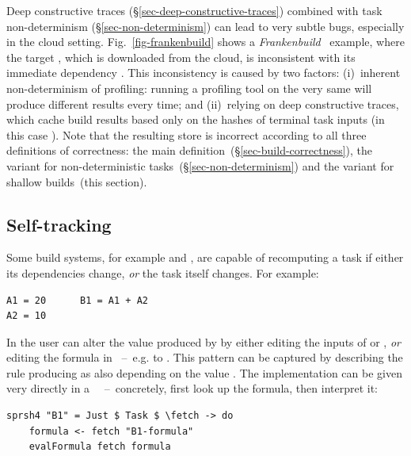 Deep constructive traces (\S\ref{sec-deep-constructive-traces}) combined with
task non-determinism (\S\ref{sec-non-determinism}) can lead to very subtle bugs,
especially in the cloud setting. Fig.~\ref{fig-frankenbuild} shows a
\emph{Frankenbuild}~\cite{esfahani2016cloudbuild} example, where the target
, which is downloaded from the cloud, is inconsistent with its
immediate dependency . This inconsistency is caused by two factors:
(i)~inherent non-determinism of profiling: running a profiling tool on the very
same  will produce different  results every time;
and (ii)~relying on deep constructive traces, which cache build results based
only on the hashes of terminal task inputs (in this case ). Note
that the resulting store is incorrect according to all three definitions of
correctness: the main definition~(\S\ref{sec-build-correctness}), the variant
for non-deterministic tasks~(\S\ref{sec-non-determinism}) and the variant for
shallow builds~(this section).


\subsection{Self-tracking}\label{sec-tracking-aspects}

Some build systems, for example \Excel and \Ninja, are capable of recomputing a
task if either its dependencies change, \emph{or} the task itself changes. For
example:

\vspace{0.5mm}
\begin{verbatim}
A1 = 20      B1 = A1 + A2
A2 = 10
\end{verbatim}
\vspace{0.5mm}

\noindent
In \Excel the user can alter the value produced by  by either editing
the inputs of  or , \emph{or} editing the formula in
~--~e.g. to . This pattern can be captured by describing
the rule producing  as also depending on the value .
The implementation can be given very directly in a
~~--~concretely, first look up the formula, then interpret
it:

\vspace{1mm}
\begin{verbatim}
sprsh4 "B1" = Just $ Task $ \fetch -> do
    formula <- fetch "B1-formula"
    evalFormula fetch formula
\end{verbatim}
\vspace{1mm}

